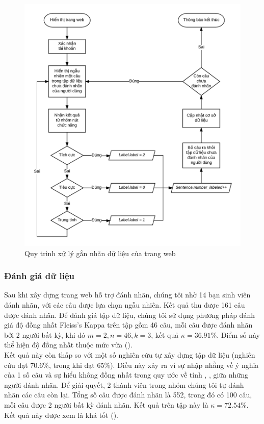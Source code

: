 \begin{figure}[H]
\centering
\includegraphics[scale=0.27]{../hinh/UpdateDatabase.png}
\caption{Quy trình xử lý gắn nhãn dữ liệu của trang web}
\label{fig:updatedb}
\end{figure}

\subsubsection*{Đánh giá dữ liệu}
Sau khi xây dựng trang web hỗ trợ đánh nhãn, chúng tôi nhờ 14 bạn sinh viên đánh nhãn, với các câu được lựa chọn ngẫu nhiên. Kết quả thu được 161 câu được đánh nhãn. Để đánh giá tập dữ liệu, chúng tôi sử dụng phương pháp đánh giá độ đồng nhất Fleiss's Kappa trên tập gồm 46 câu, mỗi câu được đánh nhãn bởi 2 người bất kỳ, khi đó $m=2, n=46, k=3$, kết quả $\kappa = 36.91\% $. Điểm số này thể hiện độ đồng nhất thuộc mức vừa (). \\

Kết quả này còn thấp so với một số nghiên cứu tự xây dựng tập dữ liệu (nghiên cứu \cite{sarker2011outcome} đạt 70.6\%, trong khi \cite{ali2013can} đạt 65\%). Điều này xảy ra vì sự nhập nhằng về ý nghĩa của 1 số câu và sự hiểu không đồng nhất trong quy ước về tính \tichcuc, \tieucuc, \trungtinh giữa những người đánh nhãn. Để giải quyết, 2 thành viên trong nhóm chúng tôi tự đánh nhãn các câu còn lại. Tổng số câu được đánh nhãn là 552, trong đó có 100 câu, mỗi câu được 2 người bất kỳ đánh nhãn. Kết quả  trên tập này là $\kappa=72.54\%$. Kết quả này được xem là khá tốt ().

